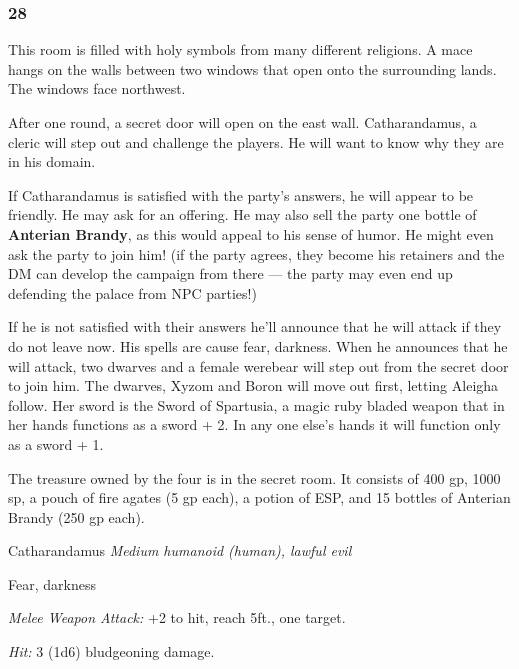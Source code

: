\documentclass[palace_of_the_silver_princess]{subfiles}
\begin{document}
\subsubsection{28}
\begin{quotebox}
    This room is filled with holy symbols from many different religions.
    A mace hangs on the walls between two windows that open onto the
    surrounding lands. The windows face northwest.
\end{quotebox}

After one round, a secret door will open on the east wall.
Catharandamus, a cleric will step out and challenge the players. He will
want to know why they are in his domain.

If Catharandamus is satisfied with the party’s answers, he will appear
to be friendly. He may ask for an offering. He may also sell the party
one bottle of \textbf{Anterian Brandy}, as this would appeal to his
sense of humor. He might even ask the party to join him!  (if the party
agrees, they become his retainers and the DM can develop the campaign
from there — the party may even end up defending the palace from NPC
parties!)

If he is not satisfied with their answers he’ll announce that he will
attack if they do not leave now. His spells are cause fear, darkness.
When he announces that he will attack, two dwarves and a female werebear
will step out from the secret door to join him. The dwarves, Xyzom
and Boron will move out first, letting Aleigha follow.  Her sword is the
Sword of Spartusia, a magic ruby bladed weapon that in her hands
functions as a sword + 2. In any one else's hands it will function only
as a sword + 1. 

The treasure owned by the four is in the secret room. It consists of
400 gp, 1000 sp, a pouch of fire agates (5 gp each), a potion of ESP,
and 15 bottles of Anterian Brandy (250 gp each).

\begin{monsterbox}{Catharandamus}
    \textit{Medium humanoid (human), lawful evil}\\
	\hline
	\basics[
		armorclass = {13},
		hitpoints = {27 (5d8 + 5)},
		speed = {25~ft.}]
	\hline
	\stats[
		STR = \stat{10},
		DEX = \stat{10},
		CON = \stat{12},
		INT = \stat{13},
		WIS = \stat{16},
		CHA = \stat{13}]
	\hline
	\details[
        skills = {Medicine +7, Persuasion +3, Religion +4},
		senses = {passive Perception 13},
        languages = {Common, Dwarvish},
		challenge = {2 (450 XP)}]
	\hline
    \begin{monsteraction}[Cantrips]
        Fear, darkness
    \end{monsteraction}


    \begin{monsteraction}[Mace]
        \textit{Melee Weapon Attack:} +2 to hit, reach 5ft., one target. 

        \textit{Hit:} 3 (1d6) bludgeoning damage.
    \end{monsteraction}
\end{monsterbox}
\end{document}
